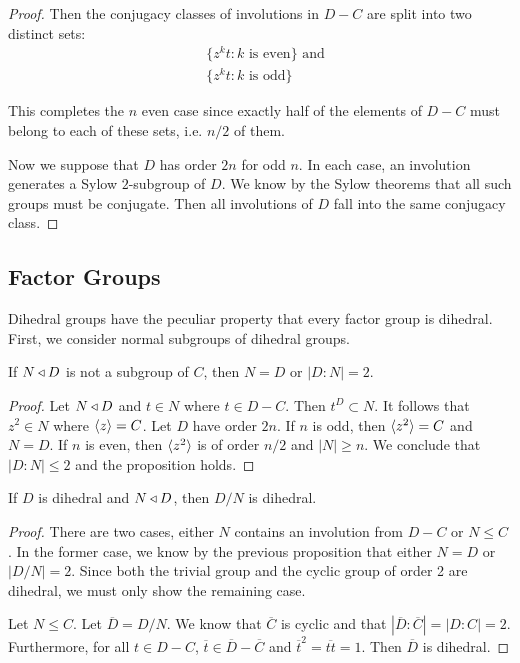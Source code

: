 \documentclass[main.tex]{subfiles}
\begin{document}
\begin{proof}
Then the conjugacy classes of involutions in $D - C$ are split into two distinct sets:
\begin{align*}
&\{z^k t : k \text{ is even}\} \text{ and} \\
&\{z^k t : k \text{ is odd}\}
\end{align*}

This completes the $n$ even case since exactly half of the elements of $D - C$ must belong to each of these sets, i.e. $n/2$ of them.

Now we suppose that $D$ has order $2n$ for odd $n$. In each case, an involution generates a Sylow $2$-subgroup of $D$. We know by the Sylow theorems that all such groups must be conjugate. Then all involutions of $D$ fall into the same conjugacy class.
\end{proof}

\subsection{Factor Groups}

Dihedral groups have the peculiar property that every factor group is dihedral. First, we consider normal subgroups of dihedral groups.

\begin{proposition}
If $N \triangleleft D$ is not a subgroup of $C$, then $N = D$ or $|D : N| = 2$.
\end{proposition}

\begin{proof}
Let $N \triangleleft D$ and $t \in N$ where $t \in D - C$. Then $t^D \subset N$. It follows that $z^2 \in N$ where $\langle z \rangle = C$. Let $D$ have order $2n$. If $n$ is odd, then $\langle z^2 \rangle = C$ and $N = D$. If $n$ is even, then $\langle z^2 \rangle$ is of order $n/2$ and $|N| \ge n$. We conclude that $|D : N| \le 2$ and the proposition holds.
\end{proof}

\begin{proposition}
If $D$ is dihedral and $N \triangleleft D$, then $D/N$ is dihedral.
\end{proposition}

\begin{proof}
There are two cases, either $N$ contains an involution from $D - C$  or $N \le C$. In the former case, we know by the previous proposition that either $N = D$ or $|D/N| = 2$. Since both the trivial group and the cyclic group of order 2 are dihedral, we must only show the remaining case.

Let $N \le C$. Let $\overline{D} = D/N$. We know that $\overline{C}$ is cyclic and that $|\overline{D} : \overline{C}| = |D : C| = 2$. Furthermore, for all $t \in D - C$, $\overline{t} \in \overline{D} - \overline{C}$ and $\overline{t}^2 = \overline{tt} = 1$. Then $\overline{D}$ is dihedral.

\end{proof}
\end{document}
